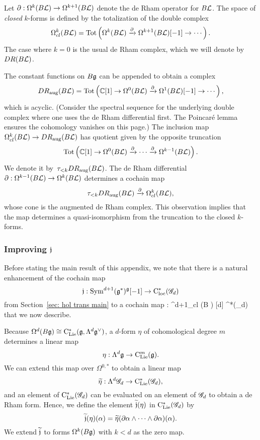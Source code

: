 Let $\partial : \Omega^{k}(B\mathcal L) \to \Omega^{k+1}(B\mathcal L)$ denote the de Rham operator for $B\mathcal L$. 
The space of {\em closed} $k$-forms is defined by the totalization of the double complex
\[
\Omega^{k}_{cl}(B \mathcal L) = {\rm Tot}\left( \Omega^k(B\mathcal L) \xrightarrow{\partial} \Omega^{k+1}(B \mathcal L)[-1] \to \cdots \right).
\]
The case where $k=0$ is the usual de Rham complex, which we will denote by~$DR(B\mathcal L)$.

The constant functions on $B\mathfrak g$ can be appended to obtain a complex
\[
DR_{\rm aug}(B\mathcal L) = {\rm Tot}\left( \mathbb C[1] \to \Omega^0(B\mathcal L) \xrightarrow{\partial} \Omega^{1}(B \mathcal L)[-1] \to \cdots \right),
\]
which is acyclic.
(Consider the spectral sequence for the underlying double complex where one uses the de Rham differential first. The Poincar\'e lemma ensures the cohomology vanishes on this page.)
The inclusion map $\Omega^{k}_{cl}(B \mathcal L) \to DR_{\rm aug}(B\mathcal L)$ has quotient given by the opposite truncation
\[
 {\rm Tot}\left( \mathbb C[1] \to \Omega^0(B\mathcal L) \xrightarrow{\partial} \cdots \xrightarrow{\partial} \Omega^{k-1}(B \mathcal L)\right).
\]
We denote it by~$\tau_{< k} DR_{\rm aug}(B \mathcal L)$. 
The de Rham differential $\partial: \Omega^{k-1}(B \mathcal L) \to \Omega^{k}(B \mathcal L)$ determines a cochain map
\[
\tau_{< k} DR_{\rm aug}(B \mathcal L) \xrightarrow{\partial} \Omega^{k}_{cl}(B \mathcal L),
\]
whose cone is the augmented de Rham complex.
This observation implies that the map determines a quasi-isomorphism from the truncation to the closed $k$-forms.

\subsubsection{Improving $\mathfrak j$}

Before stating the main result of this appendix, we note that there is a natural enhancement of the cochain map
\[
\mathfrak j : {\rm Sym}^{d+1} (\mathfrak g^*)^{\mathfrak g} [-1] \to {\rm C}_{\rm loc}^*(\mathscr G_d)
\]
from Section~\ref{sec: hol trans main} to a cochain map
\beqn\label{fj1}
\fj : \Omega^{d+1}_{cl} (B \fg) [d] \to \cloc^*(\sG_d)  
\eeqn
that we now describe. 

Because $\Omega^d(B \mathfrak g) \cong {\rm C}_{{\rm Lie}}^*(\mathfrak g, \Lambda^{d} \mathfrak g^\vee)$, 
a $d$-form $\eta$ of cohomological degree $m$ determines a linear map
\[
\eta: \Lambda^d \mathfrak g \to {\rm C}_{{\rm Lie}}^m(\mathfrak g).
\]
We can extend this map over $\Omega^{0,*}$ to obtain a linear map
\[
\widetilde{\eta}: \Lambda^d \mathscr G_d \to {\rm C}_{{\rm Lie}}^*(\mathscr G_d),
\]
and an element of ${\rm C}_{{\rm Lie}}^*(\mathscr G_d)$ can be evaluated on an element of $\mathscr G_d$ to obtain a de Rham form.
Hence, we define the element $\widetilde{\mathfrak j}(\eta)$ in ${\rm C}_{{\rm Lie}}^*(\mathscr G_d)$ by 
\[
\widetilde{\mathfrak j} (\eta) (\alpha) = \widetilde{\eta}(\partial \alpha \wedge \cdots \wedge \partial \alpha) (\alpha) .
\]
We extend $\widetilde{\mathfrak j}$ to forms $\Omega^k(B\mathfrak g)$ with $k < d$ as the zero map.

